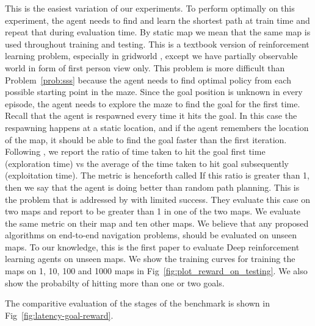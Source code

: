 \begin{description}
  \label{prob:sss}
   This is the easiest variation of our experiments. To perform
   optimally on this experiment, the agent needs to find and learn the
   shortest path at train time and repeat that during evaluation time. By static map we mean that the same map is used throughout training and testing.
  This is a textbook version of reinforcement learning problem, especially in gridworld \cite{SuBaBOOK1998}, except we have partially observable world in form of first person view only.
  This problem is more difficult than Problem~\ref{prob:sss} because the agent
  needs to find optimal policy from each possible starting point in the maze.
  Since the goal position is unknown in every episode, the agent needs to explore the maze to find the goal for the first time. Recall that the agent is respawned every time it hits the goal.
  In this case the respawning happens at a static location, and if the agent remembers the location of the map, it should be able to find the goal faster than
  the first iteration.
  Following \cite{MiPaViICLR2017}, we report the ratio
  of time taken to hit the goal first time (exploration time) vs the average of the time taken to hit goal subsequently (exploitation time). The metric is henceforth called \LatencyOneGtOne{}
  If this ratio is greater than 1, then we say that the agent is doing better than random path planning.
    This is the problem that is addressed by \cite{MiPaViICLR2017}
    with limited success. They evaluate this case on two maps and report \LatencyOneGtOne{} to be greater than 1 in one of the two maps. We evaluate the same metric on their map and ten other maps.
    We believe that any proposed algorithms on end-to-end navigation problems, should be evaluated on unseen maps.
    To our knowledge, this is the first paper to evaluate Deep reinforcement learning agents on unseen maps.
    We show the training curves for training the maps on 1, 10, 100 and 1000 maps in Fig~\ref{fig:plot_reward_on_testing}. We also show the probabilty of hitting more than one or two goals. 
\end{description}

The comparitive evaluation of the stages of the benchmark is shown in Fig~\ref{fig:latency-goal-reward}.

